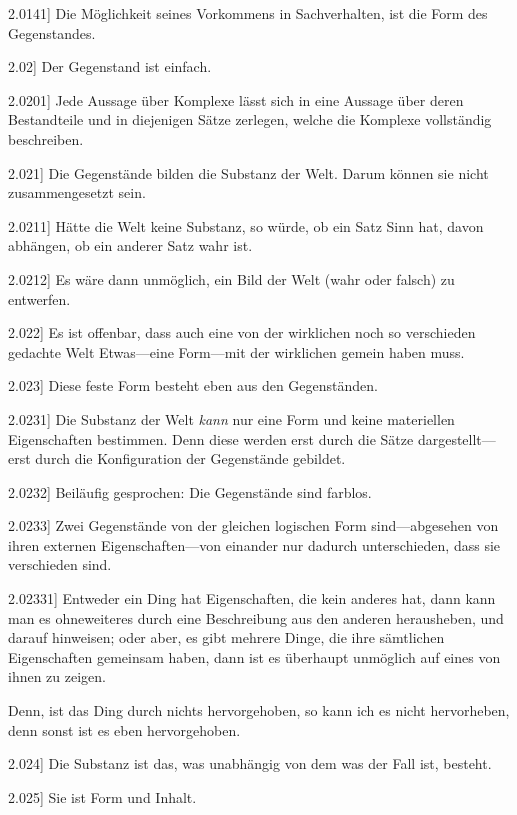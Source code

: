 \documentclass[12pt,oneside]{book}[2007/10/19]
\newcommand{\PropERef}[1]{\hyperref[PropE:#1]{#1}}
\newcommand{\PropositionG}[2]{%
  \item[\phantomsection\label{PropG:#1}\PropERef{#1}] #2%
}
\newcommand{\Emph}[1]{\emph{#1}}%
\begin{document}
\begin{propositions}
\PropositionG{2.0141}
{Die Möglichkeit seines Vorkommens in Sachverhalten,
ist die Form des Gegenstandes.}


\PropositionG{2.02}
{Der Gegenstand ist einfach.}


\PropositionG{2.0201}
{Jede Aussage über Komplexe lässt sich in eine
Aussage über deren Bestandteile und in diejenigen
Sätze zerlegen, welche die Komplexe vollständig
beschreiben.}


\PropositionG{2.021}
{Die Gegenstände bilden die Substanz der Welt.
Darum können sie nicht zusammengesetzt sein.}


\PropositionG{2.0211}
{Hätte die Welt keine Substanz, so würde, ob ein
Satz Sinn hat, davon abhängen, ob ein anderer Satz
wahr ist.}


\PropositionG{2.0212}
{Es wäre dann unmöglich, ein Bild der Welt
(wahr oder falsch) zu entwerfen.}


\PropositionG{2.022}
{Es ist offenbar, dass auch eine von der wirklichen
noch so verschieden gedachte Welt Etwas---eine
Form---mit der wirklichen gemein haben muss.}


\PropositionG{2.023}
{Diese feste Form besteht eben aus den Gegenständen.}


\PropositionG{2.0231}
{Die Substanz der Welt \Emph{kann} nur eine Form und
keine materiellen Eigenschaften bestimmen. Denn
diese werden erst durch die Sätze dar\-ge\-stellt---erst
durch die Konfiguration der Gegenstände gebildet.}


\PropositionG{2.0232}
{Beiläufig gesprochen: Die Gegenstände sind
farblos.}


\PropositionG{2.0233}
{Zwei Gegenstände von der gleichen logischen
Form sind---ab\-ge\-se\-hen von ihren externen Eigenschaften---von
einander nur dadurch unterschieden,
dass sie verschieden sind.}


\PropositionG{2.02331}
{Entweder ein Ding hat Eigenschaften, die kein
anderes hat, dann kann man es ohneweiteres durch
eine Beschreibung aus den anderen herausheben,
und darauf hinweisen; oder aber, es gibt mehrere
Dinge, die ihre sämtlichen Eigenschaften gemeinsam
haben, dann ist es überhaupt unmöglich auf
eines von ihnen zu zeigen.

Denn, ist das Ding durch nichts hervorgehoben,
so kann ich es nicht hervorheben, denn sonst ist
es eben hervorgehoben.}


\PropositionG{2.024}
{Die Substanz ist das, was unabhängig von dem
was der Fall ist, besteht.}


\PropositionG{2.025}
{Sie ist Form und Inhalt.}



\end{propositions}
\end{document}
